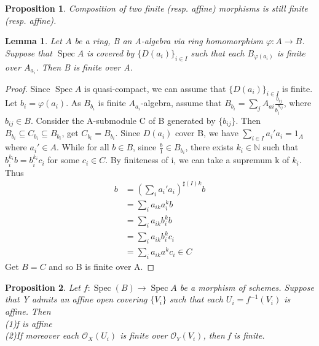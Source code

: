 \documentclass{ctexart}
\newtheorem{proposition}{Proposition}[section]
\newtheorem{lemma}{Lemma}[section]
\newcommand{\spec}{\operatorname{Spec}}
\begin{document}
\begin{proposition}
    Composition of two finite (resp. affine) morphisms is still finite (resp. affine).
    \label{Proposition 2.5} 
\end{proposition}
\begin{lemma}
    Let $A$ be a ring, B an A-algebra via ring homomorphism $\varphi: A \longrightarrow B$.
    Suppose that $\spec A$ is covered by $\{D(a_{i})\}_{i\in I}$ such that each $B_{\varphi(a_{i})}$ is finite over $A_{a_{i}}$.
    Then B is finite over A.
    \label{Lemma 2.11}
\end{lemma}
\begin{proof}
    Since $\spec A$ is quasi-compact, we can assume that $\{D(a_{i})\}_{i\in I}$ is finite.
    Let $b_{i} = \varphi(a_{i})$.
    As $B_{b_{i}}$ is finite $A_{a_{i}}$-algebra, assume that $B_{b_{i}} = \sum_{j} A_{a{i}}\frac{b_{ij}}{b_{i}^{n_{ij}}}$, where $b_{ij}\in B$.
    Consider the A-submodule C of B generated by $\{b_{ij}\}$.
    Then $B_{b_{i}} \subseteq C_{b_{i}} \subseteq B_{b_{i}}$, get $C_{b_{i}} = B_{b_{i}}$.
    Since $D(a_{i})$ cover B, we have $\sum_{i\in I} a_{i}'a_{i} = 1_{A}$ where $a_{i}'\in A$.
    While for all $b\in B$, since $\frac{b}{1}\in B_{b_{i}}$, there exists $k_{i}\in \mathbb{N}$ such that $b_{i}^{k_{i}}b = b_{i}^{k_{i}}c_{i}$ for some $c_{i}\in C$.
    By finiteness of i, we can take a supremum k of $k_{i}$.
    Thus 
    \begin{equation*}
       \begin{split}
            b & = (\sum_{i} a_{i}'a_{i})^{\sharp(I)k}b \\
            & = \sum_{i} a_{ik}a_{i}^{k}b \\ 
            & = \sum_{i} a_{ik}b_{i}^{k}b \\
            & = \sum_{i} a_{ik}b_{i}^{k}c_{i} \\
            & = \sum_{i} a_{ik}a^{k}c_{i}\in C 
       \end{split}
    \end{equation*}
    Get $B = C$ and so B is finite over A.
\end{proof}
\begin{proposition}
    Let $f: \spec(B) \longrightarrow \spec A$ be a morphism of schemes.
    Suppose that Y admits an affine open covering $\{V_{i}\}$ such that each $U_{i} = f^{-1}(V_{i})$ is affine.
    Then \\
    (1)f is affine \\
    (2)If moreover each $\mathcal{O}_{X}(U_{i})$ is finite over $\mathcal{O}_{Y}(V_{i})$, then f is finite.
    \label{Proposition 2.6}
\end{proposition}
\end{document}
